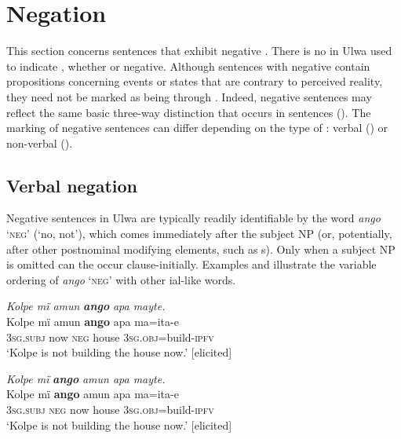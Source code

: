 \section{Negation}\label{sec:13.3}


This section concerns sentences that exhibit negative . There is no  in Ulwa used to indicate , whether  or negative. Although sentences with negative  contain propositions concerning events or states that are contrary to perceived reality, they need not be marked as being  through . Indeed, negative sentences may reflect the same basic three-way  distinction that occurs in  sentences (). The marking of negative sentences can differ depending on the type of : verbal () or non-verbal  ().



\subsection{Verbal negation}\label{sec:13.3.1}


Negative  sentences in Ulwa are typically readily identifiable by the  word \textit{ango} ‘\textsc{neg’} (‘no, not’), which comes immediately after the subject NP (or, potentially, after other postnominal modifying elements, such as s). Only when a subject NP is omitted can the  occur clause-initially. Examples  and  illustrate the variable ordering of \textit{ango} ‘\textsc{neg}’ with other ial-like words.

\ea%
    \label{ex:syntax:118}
          \textit{Kolpe mï amun} \textbf{\textit{ango}} \textit{apa mayte.}\\
\gll    Kolpe  mï      amun  \textbf{ango}  apa    ma=ita-e\\
    [name]  \textsc{3sg.subj}  now  \textsc{neg}  house  \textsc{3sg.obj}=build-\textsc{ipfv}\\
\glt `Kolpe is not building the house now.’ [elicited]
\z

\ea%
    \label{ex:syntax:119}
          \textit{Kolpe mï} \textbf{\textit{ango}} \textit{amun apa mayte.}\\
\gll    Kolpe  mï      \textbf{ango}  amun  apa    ma=ita-e\\
    [name]  \textsc{3sg.subj}  \textsc{neg}  now  house  \textsc{3sg.obj}=build-\textsc{ipfv}\\
\glt `Kolpe is not building the house now.’ [elicited]
\z

